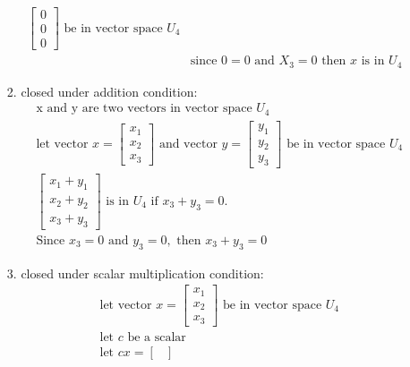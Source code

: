 \documentclass[11pt]{article}
\begin{document}
\begin{enumerate}
\begin{enumerate}
\begin{enumerate}
\[\begin{aligned}
\begin{bmatrix}
                0 \\
                0 \\
                0
            \end{bmatrix} \text{ be in vector space } U_4 \\
            &\text{since } 0 = 0 \text{ and } X_3 = 0 \text{ then } x \text{ is in } U_4
        \end{aligned}
        \]
        \item closed under addition condition:
        \[
        \begin{aligned}
            &\text{x and y are two vectors in  vector space } U_4 \\
            &\text{let vector } x = \begin{bmatrix}
                x_1 \\
                x_2 \\
                x_3
            \end{bmatrix} \text{ and vector } y = \begin{bmatrix}
                y_1 \\
                y_2 \\
                y_3
            \end{bmatrix} \text{ be in vector space } U_4 \\
            &\begin{bmatrix}
                x_1 + y_1 \\
                x_2 + y_2 \\
                x_3 + y_3
            \end{bmatrix} \text{ is in } U_4  \text{ if } x_3 + y_3 = 0.\\ 
            &\text{Since } x_3 = 0 \text{ and } y_3 = 0, \text{ then } x_3 + y_3 = 0
        \end{aligned}
        \]
        \item closed under scalar multiplication condition:
        \[
        \begin{aligned}
            &\text{let vector } x = \begin{bmatrix}
                x_1 \\
                x_2 \\
                x_3
            \end{bmatrix} \text{ be in vector space } U_4 \\
            &\text{let } c \text{ be a scalar} \\
            &\text{let } cx = \begin{bmatrix}

\end{bmatrix}
\end{aligned}\]
\end{enumerate}
\end{enumerate}
\end{enumerate}
\end{document}
